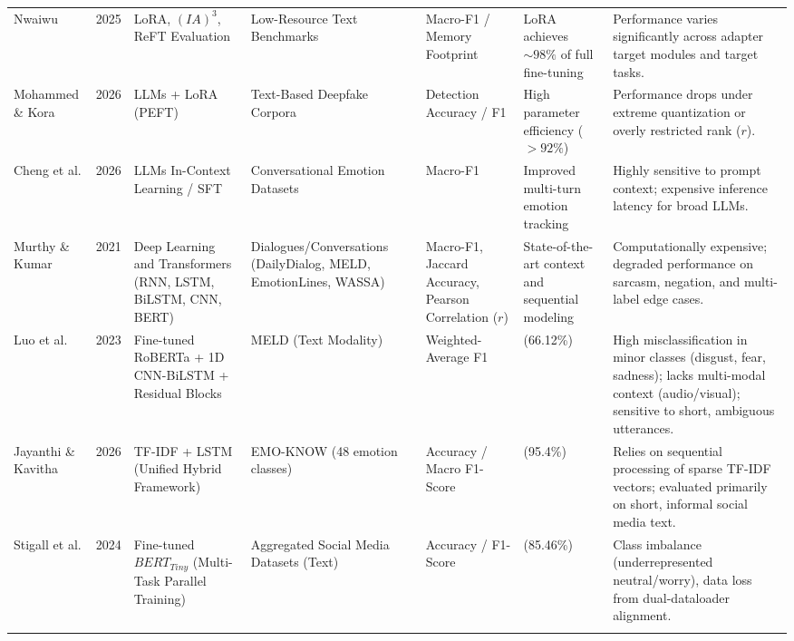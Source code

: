 \documentclass[conference]{IEEEtran}
\begin{document}
\begin{table}[t]
\begin{tabularx}{\textwidth}{@{} >{\hsize=0.85\hsize}X c >{\hsize=1.05\hsize}X >{\hsize=1.0\hsize}X >{\hsize=0.85\hsize}X >{\hsize=1.05\hsize}X >{\hsize=1.2\hsize}X @{}}
Nwaiwu \cite{nwaiwu2025peft} & 2025 & LoRA, $(IA)^3$, ReFT Evaluation & Low-Resource Text Benchmarks & Macro-F1 / Memory Footprint & LoRA achieves $\sim 98\%$ of full fine-tuning & Performance varies significantly across adapter target modules and target tasks. \\
\addlinespace

Mohammed \& Kora \cite{mohammed2026deepfake} & 2026 & LLMs + LoRA (PEFT) & Text-Based Deepfake Corpora & Detection Accuracy / F1 & High parameter efficiency ($>92\%$) & Performance drops under extreme quantization or overly restricted rank ($r$). \\
\addlinespace

Cheng et al. \cite{cheng2026personality} & 2026 & LLMs In-Context Learning / SFT & Conversational Emotion Datasets & Macro-F1 & Improved multi-turn emotion tracking & Highly sensitive to prompt context; expensive inference latency for broad LLMs. \\
\addlinespace

Murthy \& Kumar \cite{murthy2021review} & 2021 & Deep Learning and Transformers (RNN, LSTM, BiLSTM, CNN, BERT) & Dialogues/Conversations (DailyDialog, MELD, EmotionLines, WASSA) & Macro-F1, Jaccard Accuracy, Pearson Correlation ($r$) & State-of-the-art context and sequential modeling & Computationally expensive; degraded performance on sarcasm, negation, and multi-label edge cases. \\
\addlinespace

Luo et al. \cite{luo23_interspeech} & 2023 & Fine-tuned RoBERTa + 1D CNN-BiLSTM + Residual Blocks & MELD (Text Modality) & Weighted-Average F1 & 0.6612 (66.12\%) & High misclassification in minor classes (disgust, fear, sadness); lacks multi-modal context (audio/visual); sensitive to short, ambiguous utterances. \\
\addlinespace

Jayanthi \& Kavitha \cite{Jayanthi_Kavitha_2026} & 2026 & TF-IDF + LSTM (Unified Hybrid Framework) & EMO-KNOW (48 emotion classes) & Accuracy / Macro F1-Score & 0.954 (95.4\%) & Relies on sequential processing of sparse TF-IDF vectors; evaluated primarily on short, informal social media text. \\
\addlinespace

Stigall et al. \cite{stigall2024large} & 2024 & Fine-tuned $BERT_{Tiny}$ (Multi-Task Parallel Training) & Aggregated Social Media Datasets (Text) & Accuracy / F1-Score & 0.8546 (85.46\%) & Class imbalance (underrepresented neutral/worry), data loss from dual-dataloader alignment. \\
\addlinespace


\end{tabularx}
\end{table}
\end{document}
